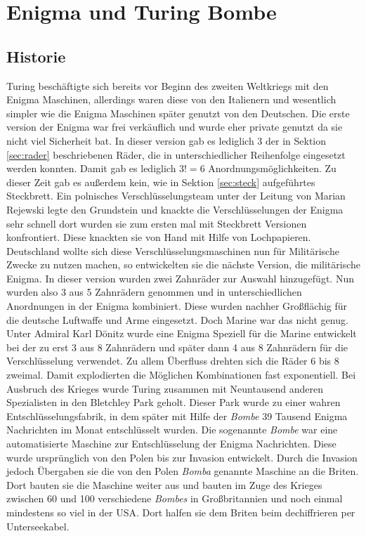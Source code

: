 \section{Enigma und Turing Bombe}

\subsection{Historie}
Turing beschäftigte sich bereits vor Beginn des zweiten Weltkriegs mit den Enigma Maschinen, allerdings waren diese von den Italienern und wesentlich simpler wie die Enigma Maschinen später genutzt von den Deutschen. Die erste version der Enigma war frei verkäuflich und wurde eher private genutzt da sie nicht viel Sicherheit bat. In dieser version gab es lediglich 3 der in Sektion \ref{sec:rader} beschriebenen Räder, die in unterschiedlicher Reihenfolge eingesetzt werden konnten. Damit gab es lediglich $3! = 6$ Anordnungsmöglichkeiten. Zu dieser Zeit gab es außerdem kein, wie in Sektion \ref{sec:steck} aufgeführtes Steckbrett. Ein polnisches Verschlüsselungsteam unter der Leitung von Marian Rejewski legte den Grundstein und knackte die Verschlüsselungen der Enigma sehr schnell dort wurden sie zum ersten mal mit Steckbrett Versionen konfrontiert. Diese knackten sie von Hand mit Hilfe von Lochpapieren. Deutschland wollte sich diese Verschlüsselungsmaschinen nun für Militärische Zwecke zu nutzen machen, so entwickelten sie die nächste Version, die militärische Enigma. In dieser version wurden zwei Zahnräder zur Auswahl hinzugefügt. Nun wurden also 3 aus 5 Zahnrädern genommen und in unterschiedlichen Anordnungen in der Enigma kombiniert. Diese wurden nachher Großflächig für die deutsche Luftwaffe und Arme eingesetzt. Doch Marine war das nicht genug. Unter Admiral Karl Dönitz wurde eine Enigma Speziell für die Marine entwickelt bei der zu erst 3 aus 8 Zahnrädern und später dann 4 aus 8 Zahnrädern für die Verschlüsselung verwendet. Zu allem Überfluss drehten sich die Räder 6 bis 8 zweimal. Damit explodierten die Möglichen Kombinationen fast exponentiell. Bei Ausbruch des Krieges wurde Turing zusammen mit Neuntausend anderen Spezialisten in den Bletchley Park geholt. Dieser Park wurde zu einer wahren Entschlüsselungsfabrik, in dem später mit Hilfe der \emph{Bombe} 39 Tausend Enigma Nachrichten im Monat entschlüsselt wurden. Die sogenannte \emph{Bombe} war eine automatisierte Maschine zur Entschlüsselung der Enigma Nachrichten. Diese wurde ursprünglich von den Polen bis zur Invasion entwickelt. Durch die Invasion jedoch Übergaben sie die von den Polen \emph{Bomba} genannte Maschine an die Briten. Dort bauten sie die Maschine weiter aus und bauten im Zuge des Krieges zwischen 60 und 100 verschiedene \emph{Bombes} in Großbritannien und noch einmal mindestens so viel in der USA. Dort halfen sie dem Briten beim dechiffrieren per Unterseekabel. \cite{enigmaproblem1} \cite{theessentialturing}


